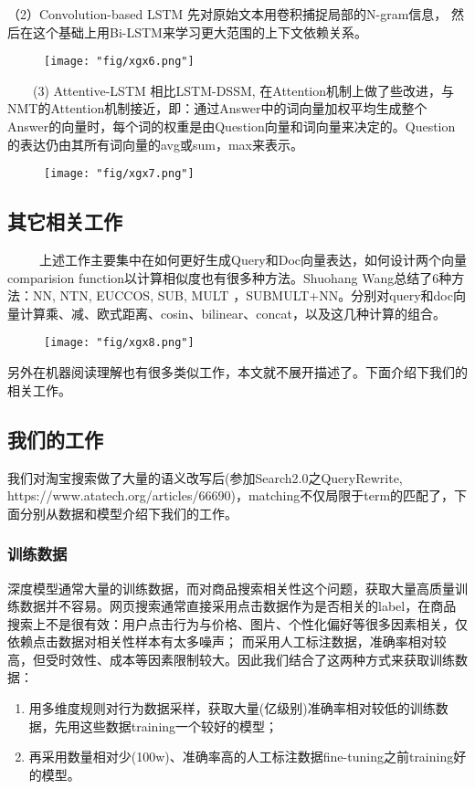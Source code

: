 （2）Convolution-based LSTM
先对原始文本用卷积捕捉局部的N-gram信息， 然后在这个基础上用Bi-LSTM来学习更大范围的上下文依赖关系。
\begin{figure}[!h]
	\centering
	\texttt{[image: "fig/xgx6.png"]}
	\caption{}
	\label{fig:xgx6}
\end{figure}

     (3) Attentive-LSTM 相比LSTM-DSSM, 在Attention机制上做了些改进，与NMT的Attention机制接近，即：通过Answer中的词向量加权平均生成整个Answer的向量时，每个词的权重是由Question向量和词向量来决定的。Question的表达仍由其所有词向量的avg或sum，max来表示。 
\begin{figure}[!h]
	\centering
	\texttt{[image: "fig/xgx7.png"]}
	\caption{}
	\label{fig:xgx7}
\end{figure}

\subsection{其它相关工作}
      上述工作主要集中在如何更好生成Query和Doc向量表达，如何设计两个向量comparision function以计算相似度也有很多种方法。Shuohang Wang总结了6种方法：NN, NTN, EUCCOS, SUB, MULT ，SUBMULT+NN。分别对query和doc向量计算乘、减、欧式距离、cosin、bilinear、concat，以及这几种计算的组合。 
\begin{figure}[!h]
	\centering
	\texttt{[image: "fig/xgx8.png"]}
	\caption{}
	\label{fig:xgx8}
\end{figure}

另外在机器阅读理解也有很多类似工作，本文就不展开描述了。下面介绍下我们的相关工作。  
\subsection{我们的工作}
我们对淘宝搜索做了大量的语义改写后(参加Search2.0之QueryRewrite, https://www.atatech.org/articles/66690)，matching不仅局限于term的匹配了，下面分别从数据和模型介绍下我们的工作。
\subsubsection{训练数据}
深度模型通常大量的训练数据，而对商品搜索相关性这个问题，获取大量高质量训练数据并不容易。网页搜索通常直接采用点击数据作为是否相关的label，在商品搜索上不是很有效：用户点击行为与价格、图片、个性化偏好等很多因素相关，仅依赖点击数据对相关性样本有太多噪声； 而采用人工标注数据，准确率相对较高，但受时效性、成本等因素限制较大。因此我们结合了这两种方式来获取训练数据：
\begin{enumerate}
\item 用多维度规则对行为数据采样，获取大量(亿级别)准确率相对较低的训练数据，先用这些数据training一个较好的模型；
\item 再采用数量相对少(100w)、准确率高的人工标注数据fine-tuning之前training好的模型。
\end{enumerate}
 
